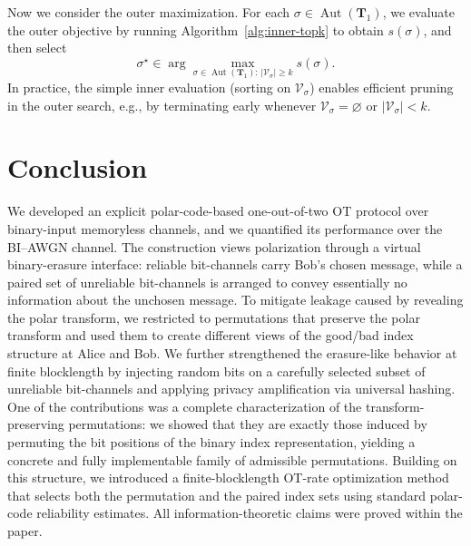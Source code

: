 \documentclass[onecolumn]{IEEEtran} %
\newcommand{\1}{\mathbbm{1}}
\DeclareMathOperator{\Aut}{Aut}
\theoremstyle{boldremark}
\newcommand{\bT}{\mathbf{T}}
\begin{document}
Now we consider the outer maximization. For each $\sigma\in\Aut(\bT_1)$, we evaluate the outer objective by running Algorithm~\ref{alg:inner-topk} to obtain
$s(\sigma)$, and then select
\[
\sigma^\star \in \arg\max_{\sigma\in\Aut(\bT_1):\,|\mathcal{V}_\sigma|\ge k} s(\sigma).
\]
In practice, the simple inner evaluation (sorting on $\mathcal{V}_\sigma$) enables efficient pruning in the outer search,
e.g., by terminating early whenever $\mathcal{V}_\sigma=\varnothing$ or $|\mathcal{V}_\sigma|<k$.















%
\section{Conclusion}
We developed an explicit polar-code-based one-out-of-two OT protocol over binary-input memoryless
channels, and we quantified its performance over the BI--AWGN channel.
The construction views polarization through a virtual binary-erasure interface: reliable bit-channels carry Bob's
chosen message, while a paired set of unreliable bit-channels is arranged to convey essentially no information about
the unchosen message.
To mitigate leakage caused by revealing the polar transform, we restricted to permutations that preserve the
polar transform and used them to create different views of the good/bad index structure at Alice and Bob.
We further strengthened the erasure-like behavior at finite blocklength by injecting random bits on a carefully
selected subset of unreliable bit-channels and applying privacy amplification via universal hashing.
One of the contributions was a complete characterization of the transform-preserving permutations:
we showed that they are exactly those induced by 
permuting the bit positions of the binary index representation, yielding a concrete and fully implementable family of
admissible permutations.
Building on this structure, we introduced a finite-blocklength OT-rate optimization method that selects both the
permutation and the paired index sets using standard polar-code reliability estimates. All information-theoretic claims were proved within the paper.

\appendices 
\label{sec:appendix} %
\end{document}
